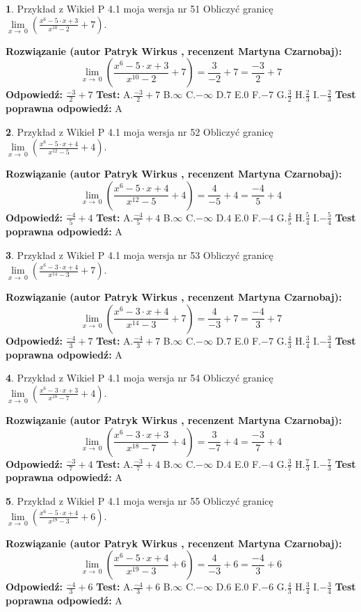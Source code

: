 \documentclass[12pt, a4paper]{article}
\theoremstyle{definition} %
\newtheorem{zad}{}
\newcommand{\zadStart}[1]{\begin{zad}#1\newline}
\newcommand{\zadStop}{\end{zad}}
\newcommand{\rozwStart}[2]{\noindent \textbf{Rozwiązanie (autor #1 , recenzent #2): }\newline}
\newcommand{\rozwStop}{\newline}
\newcommand{\odpStart}{\noindent \textbf{Odpowiedź:}\newline}
\newcommand{\odpStop}{\newline}
\newcommand{\testStart}{\noindent \textbf{Test:}\newline}
\newcommand{\testStop}{\newline}
\newcommand{\kluczStart}{\noindent \textbf{Test poprawna odpowiedź:}\newline}
\newcommand{\kluczStop}{\newline}
\begin{document}
\zadStart{Przykład z Wikieł P 4.1 moja wersja nr 51}
Obliczyć granicę $\lim\limits_{x\to\ 0}(\frac{x^{6}-5 \cdot x +3}{x^{10}-2}+7)$.
\zadStop
\rozwStart{Patryk Wirkus}{Martyna Czarnobaj}
$$\lim\limits_{x\to\ 0}(\frac{x^{6}-5 \cdot x +3}{x^{10}-2}+7)=\frac{3}{-2}+7=\frac{-3}{2}+7$$
\rozwStop
\odpStart
$\frac{-3}{2}+7$
\odpStop
\testStart
A.$\frac{-3}{2}+7$
B.$\infty$
C.$-\infty$
D.$7$
E.$0$
F.$-7$
G.$\frac{3}{2}$
H.$\frac{2}{3}$
I.$-\frac{2}{3}$
\testStop
\kluczStart
A
\kluczStop



\zadStart{Przykład z Wikieł P 4.1 moja wersja nr 52}
Obliczyć granicę $\lim\limits_{x\to\ 0}(\frac{x^{6}-5 \cdot x +4}{x^{12}-5}+4)$.
\zadStop
\rozwStart{Patryk Wirkus}{Martyna Czarnobaj}
$$\lim\limits_{x\to\ 0}(\frac{x^{6}-5 \cdot x +4}{x^{12}-5}+4)=\frac{4}{-5}+4=\frac{-4}{5}+4$$
\rozwStop
\odpStart
$\frac{-4}{5}+4$
\odpStop
\testStart
A.$\frac{-4}{5}+4$
B.$\infty$
C.$-\infty$
D.$4$
E.$0$
F.$-4$
G.$\frac{4}{5}$
H.$\frac{5}{4}$
I.$-\frac{5}{4}$
\testStop
\kluczStart
A
\kluczStop



\zadStart{Przykład z Wikieł P 4.1 moja wersja nr 53}
Obliczyć granicę $\lim\limits_{x\to\ 0}(\frac{x^{6}-3 \cdot x +4}{x^{14}-3}+7)$.
\zadStop
\rozwStart{Patryk Wirkus}{Martyna Czarnobaj}
$$\lim\limits_{x\to\ 0}(\frac{x^{6}-3 \cdot x +4}{x^{14}-3}+7)=\frac{4}{-3}+7=\frac{-4}{3}+7$$
\rozwStop
\odpStart
$\frac{-4}{3}+7$
\odpStop
\testStart
A.$\frac{-4}{3}+7$
B.$\infty$
C.$-\infty$
D.$7$
E.$0$
F.$-7$
G.$\frac{4}{3}$
H.$\frac{3}{4}$
I.$-\frac{3}{4}$
\testStop
\kluczStart
A
\kluczStop



\zadStart{Przykład z Wikieł P 4.1 moja wersja nr 54}
Obliczyć granicę $\lim\limits_{x\to\ 0}(\frac{x^{6}-3 \cdot x +3}{x^{18}-7}+4)$.
\zadStop
\rozwStart{Patryk Wirkus}{Martyna Czarnobaj}
$$\lim\limits_{x\to\ 0}(\frac{x^{6}-3 \cdot x +3}{x^{18}-7}+4)=\frac{3}{-7}+4=\frac{-3}{7}+4$$
\rozwStop
\odpStart
$\frac{-3}{7}+4$
\odpStop
\testStart
A.$\frac{-3}{7}+4$
B.$\infty$
C.$-\infty$
D.$4$
E.$0$
F.$-4$
G.$\frac{3}{7}$
H.$\frac{7}{3}$
I.$-\frac{7}{3}$
\testStop
\kluczStart
A
\kluczStop



\zadStart{Przykład z Wikieł P 4.1 moja wersja nr 55}
Obliczyć granicę $\lim\limits_{x\to\ 0}(\frac{x^{6}-5 \cdot x +4}{x^{19}-3}+6)$.
\zadStop
\rozwStart{Patryk Wirkus}{Martyna Czarnobaj}
$$\lim\limits_{x\to\ 0}(\frac{x^{6}-5 \cdot x +4}{x^{19}-3}+6)=\frac{4}{-3}+6=\frac{-4}{3}+6$$
\rozwStop
\odpStart
$\frac{-4}{3}+6$
\odpStop
\testStart
A.$\frac{-4}{3}+6$
B.$\infty$
C.$-\infty$
D.$6$
E.$0$
F.$-6$
G.$\frac{4}{3}$
H.$\frac{3}{4}$
I.$-\frac{3}{4}$
\testStop
\kluczStart
A
\kluczStop
\end{document}
